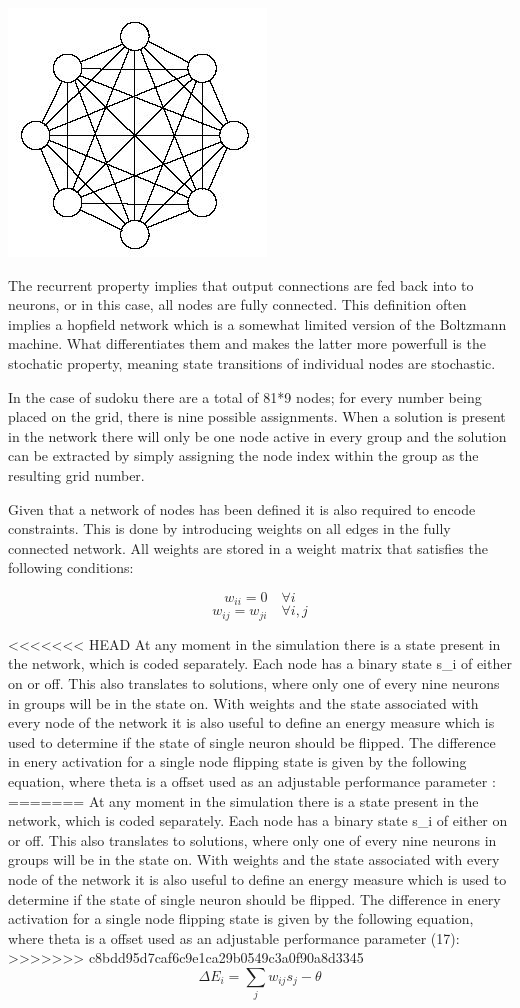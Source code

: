 \documentclass[a4paper,11pt]{kth-mag}
\begin{document}
\includegraphics{images/neural1.png}

The recurrent property implies that output connections are fed back into to neurons, or in this case, all nodes are fully connected.
This definition often implies a hopfield network which is a somewhat limited version of the Boltzmann machine.
What differentiates them and makes the latter more powerfull is the stochatic property, meaning state transitions of individual nodes are stochastic.

In the case of sudoku there are a total of 81*9 nodes; for every number being placed on the grid, there is nine possible assignments.
When a solution is present in the network there will only be one node active in every group and the solution can be extracted by simply assigning the node index within the group as the resulting grid number.

Given that a network of nodes has been defined it is also required to encode constraints.
This is done by introducing weights on all edges in the fully connected network.
All weights are stored in a weight matrix that satisfies the following conditions:

\[
w_{ii} = 0 \quad \forall i
\]
\[
w_{ij} = w_{ji} \quad \forall i,j
\]

<<<<<<< HEAD
At any moment in the simulation there is a state present in the network, which is coded separately. Each node has a binary state s\_i of either on or off. This also translates to solutions, where only one of every nine neurons in groups will be in the state on. With weights and the state associated with every node of the network it is also useful to define an energy measure which is used to determine if the state of single neuron should be flipped. The difference in enery activation for a single node flipping state is given by the following equation, where theta is a offset used as an adjustable performance parameter \cite{boltzmann2}:
=======
At any moment in the simulation there is a state present in the network, which is coded separately.
Each node has a binary state s\_i of either on or off.
This also translates to solutions, where only one of every nine neurons in groups will be in the state on.
With weights and the state associated with every node of the network it is also useful to define an energy measure which is used to determine if the state of single neuron should be flipped.
The difference in enery activation for a single node flipping state is given by the following equation, where theta is a offset used as an adjustable performance parameter (17):
>>>>>>> c8bdd95d7caf6c9e1ca29b0549c3a0f90a8d3345
\[
\Delta E_{i} = \sum_{j} w_{ij} s_{j} - \theta
\]
\end{document}
